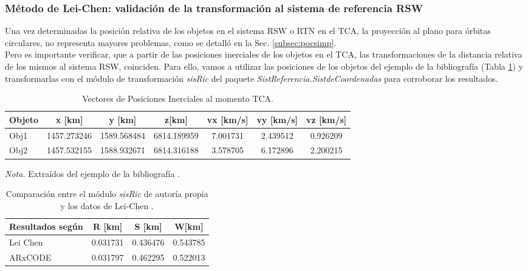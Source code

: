 \subsubsection*{M\'etodo de Lei-Chen: validaci\'on de la transformaci\'on al sistema de referencia RSW}

Una vez determinadas la posici\'on relativa de los objetos en el sistema RSW o RTN en el TCA, la proyecci\'on al plano para \'orbitas circulares, no representa mayores problemas, como se detall\'o en la Sec. \ref{subsec:pocsimp}.\\

Pero es importante verificar, que a partir de las posiciones inerciales de los objetos en el TCA, las transformaciones de la distancia relativa de los mismos al sistema RSW, coinciden.
Para ello, vamos a utilizar las posiciones de los objetos del ejemplo de la bibliograf\'ia (Tabla \ref{tab:vectejemplo}) y transformarlas con el m\'odulo de transformaci\'on {\it{sisRic}} del paquete {\it{SistReferencia.SistdeCoordenadas}} para corroborar los resultados.

\begin{table}[!h]
\caption{Vectores de Posiciones Inerciales al momento TCA.}
\begin{tabular}{lcccccc}
\hline
Objeto & x [km] & y [km] &z[km] &vx [km/s] &vy [km/s] &vz [km/s]\\
\hline
Obj1 & 1457.273246 &1589.568484&6814.189959&7.001731&2.439512&0.926209\\
Obj2 & 1457.532155&1588.932671&6814.316188&3.578705&6.172896&2.200215\\
\hline
\end{tabular}
\label{tab:vectejemplo}
\begin{flushleft}
\small {\it{Nota.}} Extra\'idos del ejemplo de la bibliograf\'ia \citep{leichen}.
\end{flushleft}
\end{table}

\begin{table}[!h]
\caption{Comparaci\'on entre el m\'odulo {\it{sisRic}} de autor\'ia propia \\y los datos de Lei-Chen \citep{leichen}.}
\begin{tabular}{lccc}
\hline
Resultados seg\'un & R [km] & S [km] & W[km] \\
\hline
Lei Chen & 0.031731& 0.436476&0.543785\\
ARxCODE & 0.031797& 0.462295 &0.522013
\\
\hline
\end{tabular}
\label{tab:rswcomp}
\end{table}

